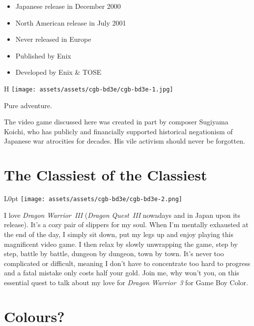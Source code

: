 \documentclass{book}
\begin{document}
\begin{itemize} \setlength\itemsep{-0.4em}
\item Japanese release in December 2000
\item North American release in July 2001
\item Never released in Europe
\item Published by Enix
\item Developed by Enix \& TOSE
\end{itemize}\noindent

\begin{wrapfigure}{H}{\linewidth}
\vskip 4pt
\centering \texttt{[image: assets/assets/cgb-bd3e/cgb-bd3e-1.jpg]}\par\pagetwodescription Pure adventure.\end{wrapfigure}
\clearpage

The video game discussed here was created in part by composer Sugiyama Koichi, who has publicly and financially supported historical negationism of Japanese war atrocities for decades. His vile activism should never be forgotten.

\FloatBarrier\needspace{5pt}\section*{The Classiest of the Classiest}\nopagebreak[4]

\begin{wrapfigure}{L}{0pt} \texttt{[image: assets/assets/cgb-bd3e/cgb-bd3e-2.png]}\end{wrapfigure}
I love \emph{Dragon Warrior III} (\emph{Dragon Quest III} nowadays and in Japan upon its release). It’s a cozy pair of slippers for my soul. When I’m mentally exhausted at the end of the day, I simply sit down, put my legs up and enjoy playing this magnificent video game. I then relax by slowly unwrapping the game, step by step, battle by battle, dungeon by dungeon, town by town. It’s never too complicated or difficult, meaning I don’t have to concentrate too hard to progress and a fatal mistake only costs half your gold. Join me, why won’t you, on this essential quest to talk about my love for \emph{Dragon Warrior 3} for Game Boy Color.

\FloatBarrier\needspace{5pt}\section*{Colours?}\nopagebreak[4]
\end{document}

